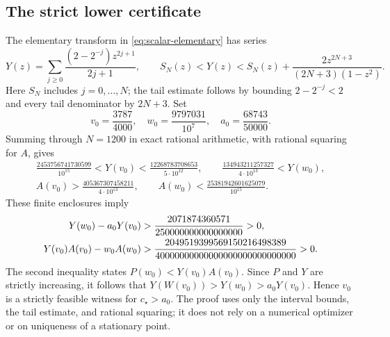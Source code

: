 \subsection{The strict lower certificate}
The elementary transform in \eqref{eq:scalar-elementary} has series
\begin{equation}
 Y(z)=\sum_{j\geq0}\frac{(2-2^{-j})z^{2j+1}}{2j+1},\qquad
 S_N(z)<Y(z)<S_N(z)+\frac{2z^{2N+3}}{(2N+3)(1-z^2)}.
 \label{eq:Y-rational-series}
\end{equation}
Here $S_N$ includes $j=0,\ldots,N$; the tail estimate follows by bounding
$2-2^{-j}<2$ and every tail denominator by $2N+3$.
Set
\[
 v_0=\frac{3787}{4000},\quad w_0=\frac{9797031}{10^7},\quad
 a_0=\frac{68743}{50000}.
\]
Summing through $N=1200$ in exact rational arithmetic, with rational
squaring for $A$, gives
\begin{gather*}
 \frac{2453756741730599}{10^{15}}<Y(v_0)
 <\frac{12268783708653}{5\cdot10^{12}},\qquad
 \frac{134943211257327}{4\cdot10^{13}}<Y(w_0),\\
 A(v_0)>\frac{405367307458211}{4\cdot10^{13}},\qquad
 A(w_0)<\frac{25381942601625079}{10^{15}}.
\end{gather*}
These finite enclosures imply
\begin{align}
 Y(w_0)-a_0Y(v_0)&>
 \frac{2071874360571}{250000000000000000}>0,\notag\\
 Y(v_0)A(v_0)-w_0A(w_0)&>
 \frac{2049519399569150216498389}{40000000000000000000000000000}>0.
 \label{eq:lower-certificate-margins}
\end{align}
The second inequality states $P(w_0)<Y(v_0)A(v_0)$.
Since $P$ and $Y$ are strictly increasing, it follows that
$Y(W(v_0))>Y(w_0)>a_0Y(v_0)$. Hence $v_0$ is a strictly
feasible witness for $c_\star>a_0$. The proof uses only the
interval bounds, the tail estimate, and rational squaring; it does not
rely on a numerical optimizer or on uniqueness of a stationary point.

